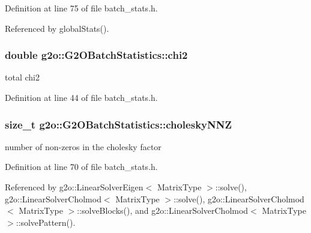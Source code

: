 Definition at line 75 of file batch\+\_\+stats.\+h.



Referenced by global\+Stats().

\subsubsection[{\texorpdfstring{chi2}{chi2}}]{\setlength{\rightskip}{0pt plus 5cm}double g2o\+::\+G2\+O\+Batch\+Statistics\+::chi2}\hypertarget{structg2o_1_1G2OBatchStatistics_a719152d550dd4fe3300d06558fe0a6d5}{}\label{structg2o_1_1G2OBatchStatistics_a719152d550dd4fe3300d06558fe0a6d5}


total chi2 



Definition at line 44 of file batch\+\_\+stats.\+h.

\subsubsection[{\texorpdfstring{cholesky\+N\+NZ}{choleskyNNZ}}]{\setlength{\rightskip}{0pt plus 5cm}size\+\_\+t g2o\+::\+G2\+O\+Batch\+Statistics\+::cholesky\+N\+NZ}\hypertarget{structg2o_1_1G2OBatchStatistics_a5996c5ba000bdfcbcf5c0375a3c62643}{}\label{structg2o_1_1G2OBatchStatistics_a5996c5ba000bdfcbcf5c0375a3c62643}


number of non-\/zeros in the cholesky factor 



Definition at line 70 of file batch\+\_\+stats.\+h.



Referenced by g2o\+::\+Linear\+Solver\+Eigen$<$ Matrix\+Type $>$\+::solve(), g2o\+::\+Linear\+Solver\+Cholmod$<$ Matrix\+Type $>$\+::solve(), g2o\+::\+Linear\+Solver\+Cholmod$<$ Matrix\+Type $>$\+::solve\+Blocks(), and g2o\+::\+Linear\+Solver\+Cholmod$<$ Matrix\+Type $>$\+::solve\+Pattern().

